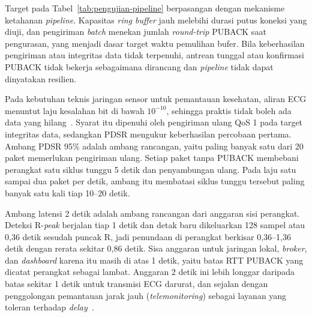 Target pada Tabel~\ref{tab:pengujian-pipeline} berpasangan dengan mekanisme ketahanan \textit{pipeline}. Kapasitas \textit{ring buffer} jauh melebihi durasi putus koneksi yang diuji, dan pengiriman \textit{batch} menekan jumlah \textit{round-trip} PUBACK saat pengurasan, yang menjadi dasar target waktu pemulihan bufer. Bila keberhasilan pengiriman atau integritas data tidak terpenuhi, antrean tunggal atau konfirmasi PUBACK tidak bekerja sebagaimana dirancang dan \textit{pipeline} tidak dapat dinyatakan resilien.

Pada kebutuhan teknis jaringan sensor untuk pemantauan kesehatan, aliran ECG menuntut laju kesalahan bit di bawah $10^{-10}$, sehingga praktis tidak boleh ada data yang hilang~\cite{zhong_2022}. Syarat itu dipenuhi oleh pengiriman ulang QoS 1 pada target integritas data, sedangkan PDSR mengukur keberhasilan percobaan pertama. Ambang PDSR 95\% adalah ambang rancangan, yaitu paling banyak satu dari 20 paket memerlukan pengiriman ulang. Setiap paket tanpa PUBACK membebani perangkat satu siklus tunggu 5 detik dan penyambungan ulang. Pada laju satu sampai dua paket per detik, ambang itu membatasi siklus tunggu tersebut paling banyak satu kali tiap 10--20 detik.

Ambang latensi 2 detik adalah ambang rancangan dari anggaran sisi perangkat. Deteksi R-\textit{peak} berjalan tiap 1 detik dan detak baru dikeluarkan 128 sampel atau 0,36 detik sesudah puncak R, jadi penundaan di perangkat berkisar 0,36--1,36 detik dengan rerata sekitar 0,86 detik. Sisa anggaran untuk jaringan lokal, \textit{broker}, dan \textit{dashboard} karena itu masih di atas 1 detik, yaitu batas RTT PUBACK yang dicatat perangkat sebagai lambat. Anggaran 2 detik ini lebih longgar daripada batas sekitar 1 detik untuk transmisi ECG darurat, dan sejalan dengan penggolongan pemantauan jarak jauh (\textit{telemonitoring}) sebagai layanan yang toleran terhadap \textit{delay}~\cite{skorinkapov_2010}.

